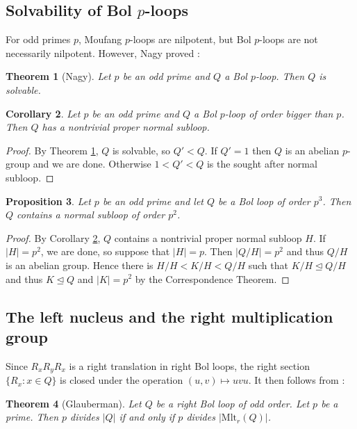 \documentclass[12pt,reqno]{amsart}
\numberwithin{equation}{section}
\theoremstyle{plain}
\newtheorem{theorem}{Theorem}[section]
\newtheorem{corollary}[theorem]{Corollary}
\newtheorem{proposition}[theorem]{Proposition}
\theoremstyle{definition}
\newcommand{\rmlt}[1]{\mathrm{Mlt}_r(#1)}
\begin{document}
\subsection{Solvability of Bol $p$-loops}

For odd primes $p$, Moufang $p$-loops are nilpotent, but Bol $p$-loops are not necessarily nilpotent. However, Nagy proved \cite[Lemma 5.1]{NagyCMUC}:

\begin{theorem}[Nagy]\label{Nagy}
Let $p$ be an odd prime and $Q$ a Bol $p$-loop. Then $Q$ is solvable.
\end{theorem}

\begin{corollary}\label{nns}
	Let $p$ be an odd prime and $Q$ a Bol $p$-loop of order bigger than $p$. Then $Q$ has a nontrivial proper normal subloop.
\end{corollary}
\begin{proof}
By Theorem \ref{Nagy}, $Q$ is solvable, so $Q'<Q$. If $Q'=1$ then $Q$ is an abelian $p$-group and we are done. Otherwise $1<Q'<Q$ is the sought after normal subloop.
\end{proof}

\begin{proposition}
Let $p$ be an odd prime and let $Q$ be a Bol loop of order $p^3$. Then $Q$ contains a normal subloop of order $p^2$.
\end{proposition}
\begin{proof}
By Corollary \ref{nns}, $Q$ contains a nontrivial proper normal subloop $H$. If $|H|=p^2$, we are done, so suppose that $|H|=p$. Then $|Q/H|=p^2$ and thus $Q/H$ is an abelian group. Hence there is $H/H<K/H<Q/H$ such that $K/H\unlhd Q/H$ and thus $K\unlhd Q$ and $|K|=p^2$ by the Correspondence Theorem.
\end{proof}

\subsection{The left nucleus and the right multiplication group}

Since $R_xR_yR_x$ is a right translation in right Bol loops, the right section $\{R_x:x\in Q\}$ is closed under the operation $(u,v)\mapsto uvu$. It then follows from \cite[Theorem 15]{Glauberman}:

\begin{theorem}[Glauberman]\label{Glaub}
Let $Q$ be a right Bol loop of odd order. Let $p$ be a prime. Then $p$ divides $|Q|$ if and only if $p$ divides $|\rmlt{Q}|$.
\end{theorem}
\end{document}
